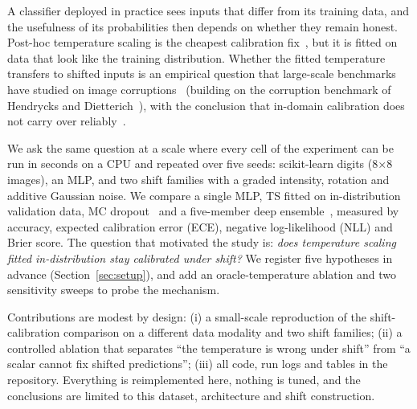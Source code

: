 A classifier deployed in practice sees inputs that differ from its training data, and the usefulness of its probabilities then depends on whether they remain honest. Post-hoc temperature scaling is the cheapest calibration fix~\cite{guo2017calibration}, but it is fitted on data that look like the training distribution. Whether the fitted temperature transfers to shifted inputs is an empirical question that large-scale benchmarks have studied on image corruptions~\cite{ovadia2019can} (building on the corruption benchmark of Hendrycks and Dietterich~\cite{hendrycks2019benchmarking}), with the conclusion that in-domain calibration does not carry over reliably~\cite{ovadia2019can,tomani2020post}.

We ask the same question at a scale where every cell of the experiment can be run in seconds on a CPU and repeated over five seeds: scikit-learn digits (8$\times$8 images), an MLP, and two shift families with a graded intensity, rotation and additive Gaussian noise. We compare a single MLP, TS fitted on in-distribution validation data, MC dropout~\cite{gal2015dropout} and a five-member deep ensemble~\cite{lakshminarayanan2016simple}, measured by accuracy, expected calibration error (ECE), negative log-likelihood (NLL) and Brier score. The question that motivated the study is: \emph{does temperature scaling fitted in-distribution stay calibrated under shift?} We register five hypotheses in advance (Section~\ref{sec:setup}), and add an oracle-temperature ablation and two sensitivity sweeps to probe the mechanism.

Contributions are modest by design: (i) a small-scale reproduction of the shift-calibration comparison on a different data modality and two shift families; (ii) a controlled ablation that separates ``the temperature is wrong under shift'' from ``a scalar cannot fix shifted predictions''; (iii) all code, run logs and tables in the repository. Everything is reimplemented here, nothing is tuned, and the conclusions are limited to this dataset, architecture and shift construction.

